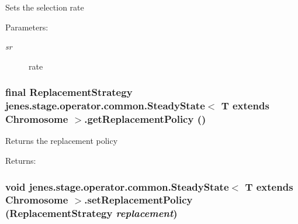 Sets the selection rate

\begin{Desc}
\item[Parameters:]
\begin{description}
\item[{\em sr}]rate \end{description}
\end{Desc}
\hypertarget{classjenes_1_1stage_1_1operator_1_1common_1_1_steady_state_3_01_t_01extends_01_chromosome_01_4_e8a1e24e3306c72bdf30094774b68915}{
\subsubsection[getReplacementPolicy]{\setlength{\rightskip}{0pt plus 5cm}final {\bf ReplacementStrategy} jenes.stage.operator.common.SteadyState$<$ T extends Chromosome $>$.getReplacementPolicy ()}}
\label{classjenes_1_1stage_1_1operator_1_1common_1_1_steady_state_3_01_t_01extends_01_chromosome_01_4_e8a1e24e3306c72bdf30094774b68915}


Returns the replacement policy

\begin{Desc}
\item[Returns:]\end{Desc}
\hypertarget{classjenes_1_1stage_1_1operator_1_1common_1_1_steady_state_3_01_t_01extends_01_chromosome_01_4_b142c49cb09d7325f9bcc5d029acd36b}{
\subsubsection[setReplacementPolicy]{\setlength{\rightskip}{0pt plus 5cm}void jenes.stage.operator.common.SteadyState$<$ T extends Chromosome $>$.setReplacementPolicy ({\bf ReplacementStrategy} {\em replacement})}}
\label{classjenes_1_1stage_1_1operator_1_1common_1_1_steady_state_3_01_t_01extends_01_chromosome_01_4_b142c49cb09d7325f9bcc5d029acd36b}



